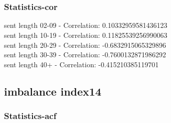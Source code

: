 \documentclass{article}%
\begin{document}
\begin{figure}[ht]%
\centering%
\setlength{\abovecaptionskip}{-35pt}%
%
%
\\%
%
%
\\%
%
\end{figure}

%
\newpage%
\subsubsection{Statistics{-}cor}%
\label{ssubsec:Statistics{-}cor}%
\noindent%
sent length 02-09 - Correlation: 0.10332959581436123\\%
sent length 10-19 - Correlation: 0.11825539256990063\\%
sent length 20-29 - Correlation: -0.6832915065329896\\%
sent length 30-39 - Correlation: -0.7600132871986292\\%
sent length 40+ - Correlation: -0.415210385119701\\

%
\newpage

%
\subsection{imbalance index14}%
\label{subsec:imbalanceindex14}%
\subsubsection{Statistics{-}acf}%
\label{ssubsec:Statistics{-}acf}%
\end{document}
